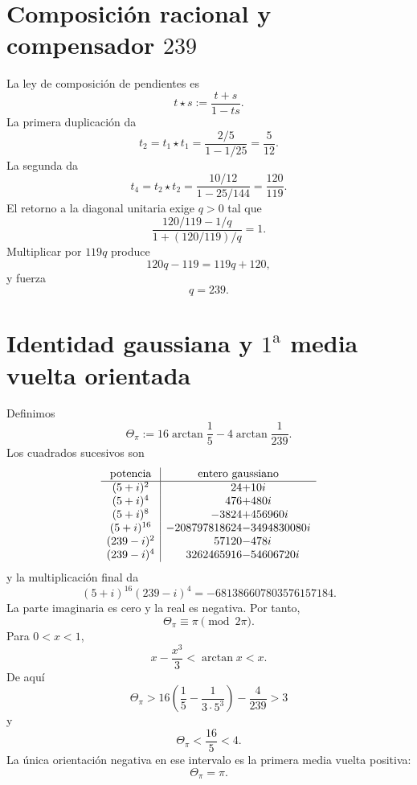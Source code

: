 \section{Composición racional y compensador \texorpdfstring{\(239\)}{239}}

La ley de composición de pendientes es
\[
 t\star s:=\frac{t+s}{1-ts}.
\]
La primera duplicación da
\[
 t_2=t_1\star t_1
 =\frac{2/5}{1-1/25}
 =\frac5{12}.
\]
La segunda da
\[
 t_4=t_2\star t_2
 =\frac{10/12}{1-25/144}
 =\frac{120}{119}.
\]
El retorno a la diagonal unitaria exige \(q>0\) tal que
\[
 \frac{120/119-1/q}{1+(120/119)/q}=1.
\]
Multiplicar por \(119q\) produce
\[
 120q-119=119q+120,
\]
y fuerza
\begin{equation}
 \boxed{q=239.}
 \label{gfp:b:eq:compensador-239-pi}
\end{equation}

\section{Identidad gaussiana y \(1^{\mathrm a}\) media vuelta orientada}

Definimos
\begin{equation}
 \Theta_\pi
 :=16\arctan\frac15-4\arctan\frac1{239}.
 \label{gfp:b:eq:theta-pi-autonoma}
\end{equation}
Los cuadrados sucesivos son
\[
\begin{array}{c|r@{}l}
\text{potencia}&\multicolumn{2}{c}{\text{entero gaussiano}}\\ \hline
(5+i)^2&24&+10i\\
(5+i)^4&476&+480i\\
(5+i)^8&-3824&+456960i\\
(5+i)^{16}&-208797818624&-3494830080i\\
(239-i)^2&57120&-478i\\
(239-i)^4&3262465916&-54606720i
\end{array}
\]
y la multiplicación final da
\begin{equation}
 \boxed{
 (5+i)^{16}(239-i)^4
 =-681386607803576157184.}
 \label{gfp:b:eq:identidad-gaussiana-pi-autonoma}
\end{equation}
La parte imaginaria es cero y la real es negativa. Por tanto,
\[
 \Theta_\pi\equiv\pi\pmod{2\pi}.
\]
Para \(0<x<1\),
\[
 x-\frac{x^3}{3}<\arctan x<x.
\]
De aquí
\[
 \Theta_\pi>
 16\left(\frac15-\frac1{3\cdot5^3}\right)-\frac4{239}>3
\]
y
\[
 \Theta_\pi<\frac{16}{5}<4.
\]
La única orientación negativa en ese intervalo es la primera media vuelta
positiva:
\begin{equation}
 \boxed{\Theta_\pi=\pi.}
 \label{gfp:b:eq:reconocimiento-pi-exacto}
\end{equation}

